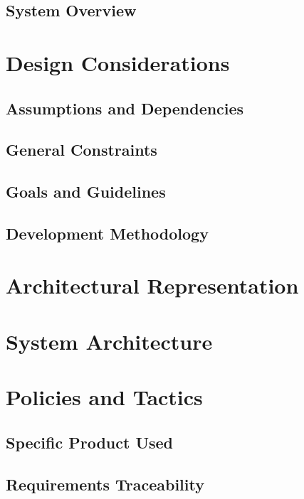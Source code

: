 \documentclass[11pt]{article}
\begin{document}
\subsection{System Overview}
\label{sec:overview}

\section{Design Considerations}
\label{sec:design}

\subsection{Assumptions and Dependencies}
\label{sec:assumptions}

\subsection{General Constraints}
\label{sec:constraints}

\subsection{Goals and Guidelines}
\label{sec:goals}

\subsection{Development Methodology}
\label{sec:methodology}

\section{Architectural Representation}
\label{sec:representation}

\section{System Architecture}
\label{sec:architecture}

\section{Policies and Tactics}
\label{sec:policies}

\subsection{Specific Product Used}
\label{sec:specific}

\subsection{Requirements Traceability}
\label{sec:traceability}
\end{document}
